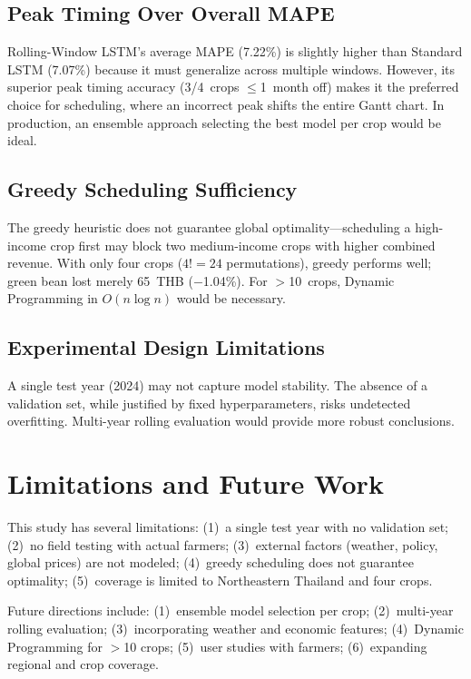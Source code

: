 \documentclass[conference]{IEEEtran}
\begin{document}
\subsection{Peak Timing Over Overall MAPE}

Rolling-Window LSTM's average MAPE (7.22\%) is slightly higher than Standard LSTM (7.07\%) because it must generalize across multiple windows. However, its superior peak timing accuracy (3/4~crops $\leq$1~month off) makes it the preferred choice for scheduling, where an incorrect peak shifts the entire Gantt chart. In production, an ensemble approach selecting the best model per crop would be ideal.

\subsection{Greedy Scheduling Sufficiency}

The greedy heuristic does not guarantee global optimality---scheduling a high-income crop first may block two medium-income crops with higher combined revenue. With only four crops ($4! = 24$ permutations), greedy performs well; green bean lost merely 65~THB ($-$1.04\%). For $>$10~crops, Dynamic Programming in $O(n \log n)$ would be necessary.

\subsection{Experimental Design Limitations}

A single test year (2024) may not capture model stability. The absence of a validation set, while justified by fixed hyperparameters, risks undetected overfitting. Multi-year rolling evaluation would provide more robust conclusions.

\section{Limitations and Future Work}

This study has several limitations: (1)~a single test year with no validation set; (2)~no field testing with actual farmers; (3)~external factors (weather, policy, global prices) are not modeled; (4)~greedy scheduling does not guarantee optimality; (5)~coverage is limited to Northeastern Thailand and four crops.

Future directions include: (1)~ensemble model selection per crop; (2)~multi-year rolling evaluation; (3)~incorporating weather and economic features; (4)~Dynamic Programming for $>$10 crops; (5)~user studies with farmers; (6)~expanding regional and crop coverage.
\end{document}
